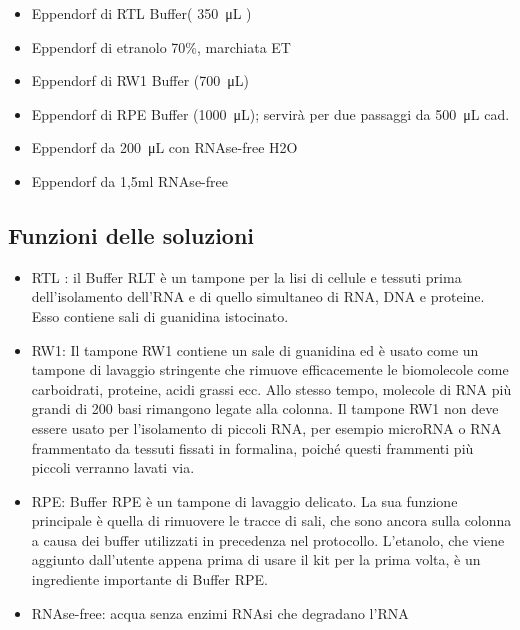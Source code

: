 \begin{itemize}

\item Eppendorf di RTL Buffer( \SI{350}{\micro\liter} )
\item Eppendorf di etranolo 70\%, marchiata ET
\item Eppendorf di RW1 Buffer (\SI{700}{\micro\liter})
\item Eppendorf di RPE Buffer (\SI{1000}{\micro\liter}); servirà per due passaggi da \SI{500}{\micro\liter} cad.
\item Eppendorf da \SI{200}{\micro\liter} con RNAse-free H2O
\item Eppendorf da 1,5ml RNAse-free
\end{itemize}

\subsection{Funzioni delle soluzioni}

\begin{itemize}

\item RTL : il Buffer RLT è un tampone per la lisi di cellule e tessuti prima
dell'isolamento dell'RNA e di quello simultaneo di  RNA, DNA e proteine.
Esso contiene sali di guanidina istocinato.

\item RW1: Il tampone RW1 contiene un sale di guanidina ed è usato come un tampone
di lavaggio stringente che rimuove efficacemente le biomolecole come carboidrati, proteine, acidi grassi ecc.
Allo stesso tempo, molecole di RNA più grandi di 200 basi rimangono legate alla colonna.
Il tampone RW1 non deve essere usato per l'isolamento di piccoli RNA, per esempio microRNA o
RNA frammentato da tessuti fissati in formalina, poiché
questi frammenti più piccoli verranno lavati via.

\item RPE: Buffer RPE è un tampone di lavaggio delicato.
La sua funzione principale è quella di rimuovere le tracce di sali,
che sono ancora sulla colonna a causa dei buffer utilizzati in precedenza nel protocollo.
L'etanolo, che viene aggiunto dall'utente appena prima di usare il kit per la prima volta,
è un ingrediente importante di Buffer RPE.

\item RNAse-free: acqua senza enzimi RNAsi che degradano l'RNA
\end{itemize}

